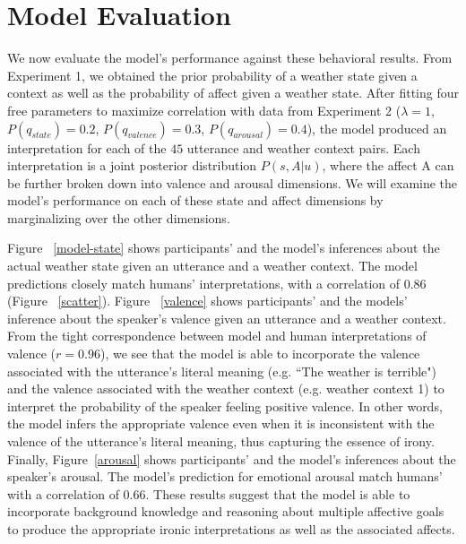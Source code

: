 \documentclass[10pt,letterpaper]{article}
\begin{document}
\section{Model Evaluation}
We now evaluate the model's performance against these behavioral results. From Experiment 1, we obtained the prior probability of a weather state given a context as well as the probability of affect given a weather state. After fitting four free parameters to maximize correlation with data from Experiment 2 ($\lambda=1$, $P(q_{state}) = 0.2$, $P(q_{valence}) = 0.3$, $P(q_{arousal}) = 0.4$), 
the model produced an interpretation for each of the $45$ utterance and weather context pairs. Each interpretation is a joint posterior distribution $P(s, A | u)$, where the affect A can be further broken down into valence and arousal dimensions. We will examine the model's performance on each of these state and affect dimensions by marginalizing over the other dimensions.

Figure ~\ref{model-state} shows participants' and the model's inferences about the actual weather state given an utterance and a weather context. The model predictions closely match humans' interpretations, with a correlation of $0.86$ (Figure ~\ref{scatter}). 
Figure ~\ref{valence} shows participants' and the models' inference about the speaker's valence given an utterance and a weather context. From the tight correspondence between model and human interpretations of valence ($r=0.96$), we see that the model is able to incorporate the valence associated with the utterance's literal meaning (e.g. ``The weather is terrible") and the valence associated with the weather context (e.g. weather context 1) to interpret the probability of the speaker feeling positive valence. In other words, the model infers the appropriate valence even when it is inconsistent with the valence of the utterance's literal meaning, thus capturing the essence of irony.  
Finally, Figure~\ref{arousal} shows participants' and the model's inferences about the speaker's arousal.  The model's prediction for emotional arousal match humans' with a correlation of $0.66$.
These results suggest that the model is able to incorporate background knowledge and reasoning about multiple affective goals to produce the appropriate ironic interpretations as well as the associated affects. 
\end{document}
